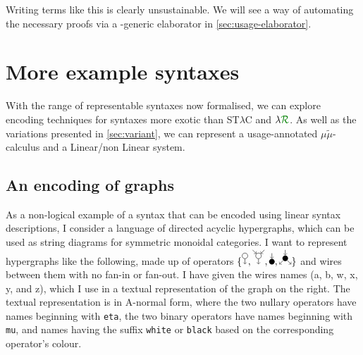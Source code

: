  Writing terms like this
is clearly unsustainable. We will see a way of automating the
necessary proofs via a -generic elaborator in
\cref{sec:usage-elaborator}.





\section{More example syntaxes}\label{sec:other-syntaxes}

With the range of representable syntaxes now formalised, we can explore encoding
techniques for syntaxes more exotic than ST$\lambda$C and $\name$.
As well as the variations presented in \cref{sec:variant}, we can represent a
usage-annotated $\mu\tilde\mu$-calculus and a Linear/non Linear system.

\subsection{An encoding of graphs}

As a non-logical example of a syntax that can be encoded using linear syntax
descriptions, I consider a language of directed acyclic hypergraphs, which can
be used as string diagrams for symmetric monoidal categories.
I want to represent hypergraphs like the following, made up of operators
$\{
\tikz{\node (n) [circle,draw,minimum size=2mm,inner sep=0] {};%
  \draw[->] (n) to (0,-3mm)},
\tikz{\node (n) [circle,draw,minimum size=2mm,inner sep=0] {};%
  \draw[->] (2.12mm,2.12mm) to (n); \draw[->] (-2.12mm,2.12mm) to (n);%
  \draw[->] (n) to (0,-3mm)},
\tikz{\node (n) [circle,fill,minimum size=2mm,inner sep=0] {};%
  \draw[->] (0,3mm) to (n)},
\tikz{\node (n) [circle,fill,minimum size=2mm,inner sep=0] {};%
  \draw[->] (n) to (2.12mm,-2.12mm); \draw[->] (n) to (-2.12mm,-2.12mm);%
  \draw[->] (0,3mm) to (n)}
\}$
and wires between them with no fan-in or fan-out.
I have given the wires names (a, b, w, x, y, and z), which I use in a textual
representation of the graph on the right.
The textual representation is in A-normal form, where the two nullary operators
have names beginning with \texttt{eta}, the two binary operators have names
beginning with \texttt{mu}, and names having the suffix \texttt{white} or
\texttt{black} based on the corresponding operator's colour.

